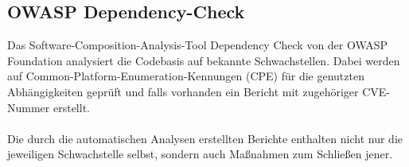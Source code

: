 \subsection{OWASP Dependency-Check} \label{sec:OWASP-Dependency-Check}
Das Software-Composition-Analysis-Tool Dependency Check von der OWASP Foundation analysiert die Codebasis auf bekannte Schwachstellen.
Dabei werden auf Common-Platform-Enumeration-Kennungen (CPE) für die genutzten Abhängigkeiten geprüft und falls vorhanden ein Bericht mit zugehöriger CVE-Nummer erstellt.
\\ \\
Die durch die automatischen Analysen erstellten Berichte enthalten nicht nur die jeweiligen Schwachstelle selbst, sondern auch Maßnahmen zum Schließen jener.